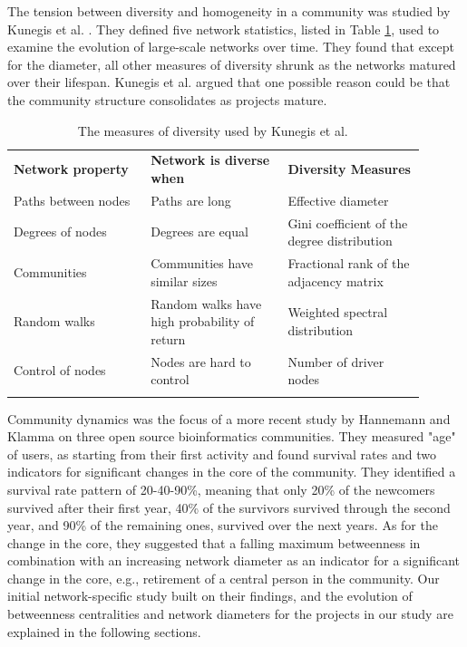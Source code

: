 \documentclass[12pt]{report}
\begin{document}
The tension between diversity and homogeneity in a community was studied by Kunegis et al. \cite{Kunegis}. They defined five network statistics, listed in Table \ref{TableDiversityMeasuresKunegisEtAl}, used to examine the evolution of large-scale networks over time. They found that except for the diameter, all other measures of diversity shrunk as the networks matured over their lifespan. Kunegis et al. \cite{Kunegis} argued that one possible reason could be that the community structure consolidates as projects mature.

\begin{table}
\centering
\caption{The measures of diversity used by Kunegis et al. \cite{Kunegis}}
\label{TableDiversityMeasuresKunegisEtAl}
\begin{tabular}{p{0.3\linewidth} p{0.3\linewidth} p{0.3\linewidth}}
\hline\noalign{\smallskip}
\textbf{Network property} & \textbf{Network is diverse when} & \textbf{Diversity Measures} \\
\noalign{\smallskip}\hline\noalign{\smallskip}
Paths between nodes & Paths are long & Effective diameter \\ \hline
Degrees of nodes  & Degrees are equal & Gini coefficient of the degree distribution \\ \hline
Communities  & Communities have similar sizes & Fractional rank of the adjacency matrix \\ \hline
Random walks  & Random walks have high probability of return & Weighted spectral distribution \\ \hline
Control of nodes  & Nodes are hard to control & Number of driver nodes \\
\noalign{\smallskip}\hline
\end{tabular}
\end{table}

Community dynamics was the focus of a more recent study by Hannemann and Klamma \cite{Hannemann} on three open source bioinformatics communities. They measured "age" of users, as starting from their first activity and found survival rates and two indicators for significant changes in the core of the community. They identified a survival rate pattern of 20-40-90\%, meaning that only 20\% of the newcomers survived after their first year, 40\% of the survivors survived through the second year, and 90\% of the remaining ones, survived over the next years. As for the change in the core, they suggested that a falling maximum betweenness in combination with an increasing network diameter as an indicator for a significant change in the core, e.g., retirement of a central person in the community. Our initial network-specific study built on their findings, and the evolution of betweenness centralities and network diameters for the projects in our study are explained in the following sections. 
\end{document}
